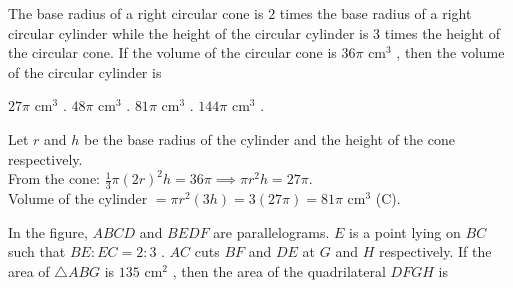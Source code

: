 
\question The base radius of a right circular cone is $2$ times the base radius of a right circular cylinder while the height of the circular cylinder is $3$ times the height of the circular cone. If the volume of the circular cone is $36\pi\text{ cm}^3$ , then the volume of the circular cylinder is
\begin{choices}
    \choice $27\pi\text{ cm}^3$ .
    \choice $48\pi\text{ cm}^3$ .
    \correctchoice $81\pi\text{ cm}^3$ .
    \choice $144\pi\text{ cm}^3$ .
\end{choices}
\begin{solution}
Let $r$ and $h$ be the base radius of the cylinder and the height of the cone respectively. \\
From the cone: $\frac{1}{3}\pi(2r)^2h = 36\pi \implies \pi r^2h = 27\pi$. \\
Volume of the cylinder $= \pi r^2(3h) = 3(27\pi) = 81\pi\text{ cm}^3$ (C).
\end{solution}

\question In the figure, $ABCD$ and $BEDF$ are parallelograms. $E$ is a point lying on $BC$ such that $BE : EC = 2 : 3$ . $AC$ cuts $BF$ and $DE$ at $G$ and $H$ respectively. If the area of $\triangle ABG$ is $135\text{ cm}^2$ , then the area of the quadrilateral $DFGH$ is

